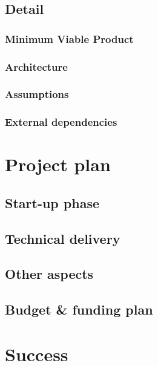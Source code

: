 \documentclass[
]{article}
\begin{document}
\subsection{Detail}\label{detail}

\subsubsection{Minimum Viable Product}\label{minimum-viable-product}

\subsubsection{Architecture}\label{architecture}

\subsubsection{Assumptions}\label{assumptions}

\subsubsection{External dependencies}\label{external-dependencies}

\section{Project plan}\label{project-plan}

\subsection{Start-up phase}\label{start-up-phase}

\subsection{Technical delivery}\label{technical-delivery}

\subsection{Other aspects}\label{other-aspects}

\subsection{Budget \& funding plan}\label{budget-funding-plan}

\section{Success}\label{success}
\end{document}
